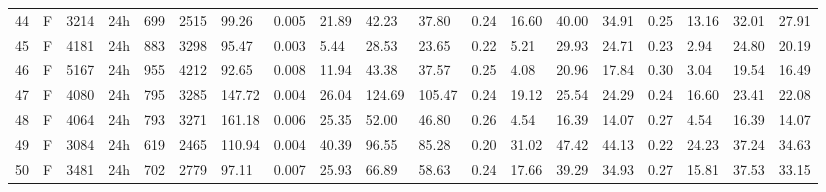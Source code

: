 \begin{tabular}{rllllllrlllllllllll}
44 & F & 3214 & 24h & 699 & 2515 & 99.26 & 0.005 & 21.89 & 42.23 & 37.80 & 0.24 & 16.60 & 40.00 & 34.91 & 0.25 & 13.16 & 32.01 & 27.91 \\
45 & F & 4181 & 24h & 883 & 3298 & 95.47 & 0.003 & 5.44 & 28.53 & 23.65 & 0.22 & 5.21 & 29.93 & 24.71 & 0.23 & 2.94 & 24.80 & 20.19 \\
46 & F & 5167 & 24h & 955 & 4212 & 92.65 & 0.008 & 11.94 & 43.38 & 37.57 & 0.25 & 4.08 & 20.96 & 17.84 & 0.30 & 3.04 & 19.54 & 16.49 \\
47 & F & 4080 & 24h & 795 & 3285 & 147.72 & 0.004 & 26.04 & 124.69 & 105.47 & 0.24 & 19.12 & 25.54 & 24.29 & 0.24 & 16.60 & 23.41 & 22.08 \\
48 & F & 4064 & 24h & 793 & 3271 & 161.18 & 0.006 & 25.35 & 52.00 & 46.80 & 0.26 & 4.54 & 16.39 & 14.07 & 0.27 & 4.54 & 16.39 & 14.07 \\
49 & F & 3084 & 24h & 619 & 2465 & 110.94 & 0.004 & 40.39 & 96.55 & 85.28 & 0.20 & 31.02 & 47.42 & 44.13 & 0.22 & 24.23 & 37.24 & 34.63 \\
50 & F & 3481 & 24h & 702 & 2779 & 97.11 & 0.007 & 25.93 & 66.89 & 58.63 & 0.24 & 17.66 & 39.29 & 34.93 & 0.27 & 15.81 & 37.53 & 33.15 \\
\bottomrule
\end{tabular}
